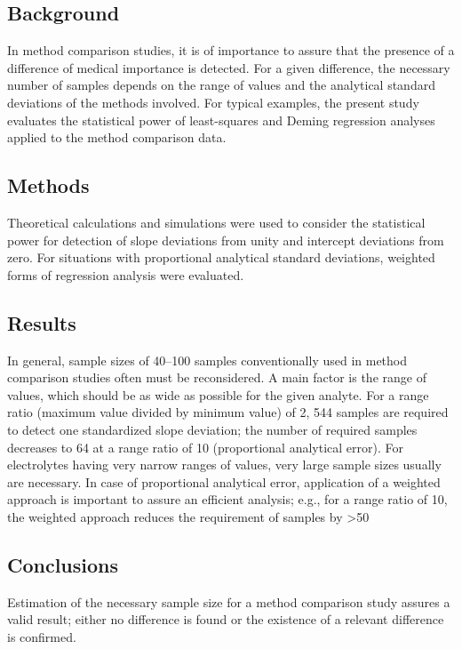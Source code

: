 \subsection{Background} 
In method comparison studies, it is of importance to assure that the presence of a difference of medical importance is detected. 
For a given difference, the necessary number of samples depends on the range of values and the analytical standard deviations of the methods involved. For typical examples, the present study evaluates the statistical power of least-squares and Deming regression analyses applied to the method comparison data.

\subsection{Methods} 
Theoretical calculations and simulations were used to consider the statistical power for detection of slope deviations from 
unity and intercept deviations from zero. For situations with proportional analytical standard deviations, weighted forms of regression analysis were evaluated.

\subsection{Results} In general, sample sizes of 40–100 samples conventionally used in method comparison studies often must 
be reconsidered. A main factor is the range of values, which should be as wide as possible for the given analyte. 
For a range ratio (maximum value divided by minimum value) of 2, 544 samples are required to detect one standardized slope 
deviation; the number of required samples decreases to 64 at a range ratio of 10 (proportional analytical error). For electrolytes having very narrow ranges of values, very large sample sizes usually are necessary. In case of proportional analytical error, application of a weighted approach is important to assure an efficient analysis; e.g., for a range ratio of 10, the weighted approach reduces the requirement of samples by >50%

\subsection{Conclusions} Estimation of the necessary sample size for a method comparison study assures a valid result; either no difference is found or the existence of a relevant difference is confirmed.




